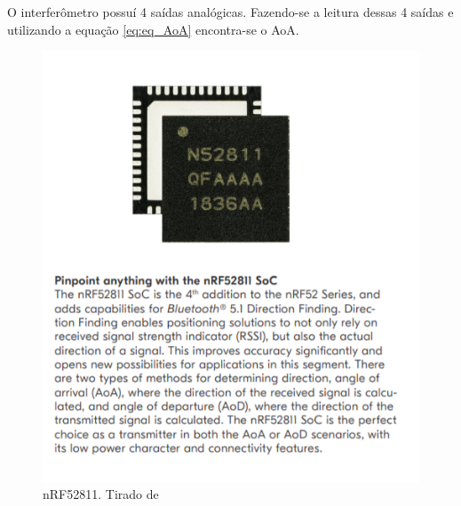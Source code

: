 O interferômetro possuí 4 saídas analógicas. Fazendo-se a leitura dessas 4 saídas e utilizando a equação \ref{eq:eq_AoA} encontra-se o AoA.

\begin{figure}[H]
	\centering 
	\includegraphics[scale = 1]{images/nRF52811.png}
	\caption{nRF52811. Tirado de \cite{nRF52811_site}}
	\label{fig:nRF52811}
\end{figure}


